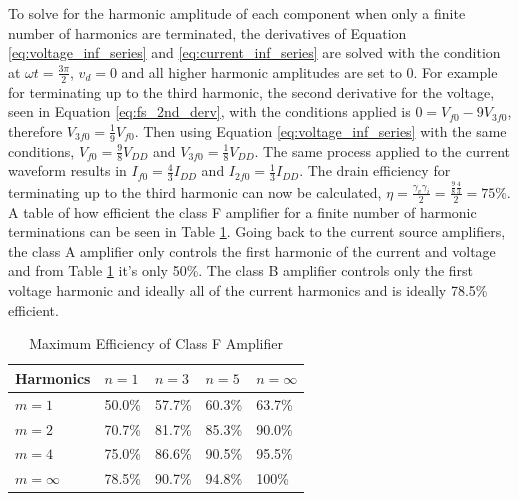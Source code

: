 To solve for the harmonic amplitude of each component when only a finite number of harmonics are terminated, the derivatives of Equation \ref{eq:voltage_inf_series} and \ref{eq:current_inf_series} are solved with the condition at $\omega t = \frac{3\pi}{2}$, $v_d=0$ and all higher harmonic amplitudes are set to 0. For example for terminating up to the third harmonic, the second derivative for the voltage, seen in Equation \ref{eq:fs_2nd_derv}, with the conditions applied is $0 = V_{f0} - 9V_{3f0}$, therefore $V_{3f0} = \frac{1}{9} V_{f0}$. Then using Equation \ref{eq:voltage_inf_series} with the same conditions, $V_{f0}=\frac{9}{8}V_{DD}$ and $V_{3f0} = \frac{1}{8}V_{DD}$. The same process applied to the current waveform results in $I_{f0}=\frac{4}{3}I_{DD}$ and $I_{2f0} = \frac{1}{3}I_{DD}$. The drain efficiency for terminating up to the third harmonic can now be calculated, $\eta = \frac{\gamma_v \gamma_i}{2} = \frac{ \frac{9}{8} \frac{4}{3} }{2} = 75\%$. A table of how efficient the class F amplifier for a finite number of harmonic terminations can be seen in Table \ref{table:harmonic_eff}. Going back to the current source amplifiers, the class A amplifier only controls the first harmonic of the current and voltage and from Table \ref{table:harmonic_eff} it's only 50\%. The class B amplifier controls only the first voltage harmonic and ideally all of the current harmonics and is ideally 78.5\% efficient. %



\begin{table}
    \caption{Maximum Efficiency of Class F Amplifier}
    \label{table:harmonic_eff}
        \begin{center}
            \begin{tabular}{|l|l|l|l|l|}
              \hline
              Harmonics    & $n = 1$ & $n =  3$ & $n = 5$ & $n = \infty$ \\ \hline
              $m = 1 $     & 50.0\% & 57.7\% & 60.3\% & 63.7\% \\ \hline
              $m = 2 $     & 70.7\% & 81.7\% & 85.3\% & 90.0\% \\ \hline
              $m = 4 $     & 75.0\% & 86.6\% & 90.5\% & 95.5\% \\ \hline
              $m = \infty $& 78.5\% & 90.7\% & 94.8\% & 100\% \\ \hline
            \end{tabular}
        \end{center}
\end{table}

